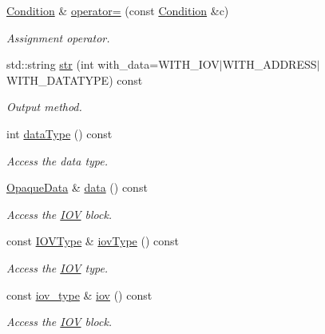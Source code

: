 \begin{DoxyCompactItemize}
\hyperlink{class_d_d4hep_1_1_conditions_1_1_condition}{Condition} \& \hyperlink{class_d_d4hep_1_1_conditions_1_1_condition_a270d3763943c0042ed991a310670ea5c}{operator=} (const \hyperlink{class_d_d4hep_1_1_conditions_1_1_condition}{Condition} \&c)
\begin{DoxyCompactList}\small\item\em Assignment operator. \item\end{DoxyCompactList}\item 
std::string \hyperlink{class_d_d4hep_1_1_conditions_1_1_condition_ac877415327919f75d4d88d3f9c67f2f5}{str} (int with\_\-data=WITH\_\-IOV$|$WITH\_\-ADDRESS$|$WITH\_\-DATATYPE) const 
\begin{DoxyCompactList}\small\item\em Output method. \item\end{DoxyCompactList}\item 
int \hyperlink{class_d_d4hep_1_1_conditions_1_1_condition_a927e07797c9f318c43aa7ed220e3b424}{dataType} () const 
\begin{DoxyCompactList}\small\item\em Access the data type. \item\end{DoxyCompactList}\item 
\hyperlink{class_d_d4hep_1_1_opaque_data}{OpaqueData} \& \hyperlink{class_d_d4hep_1_1_conditions_1_1_condition_a1154252bf161472cd72411149a10702d}{data} () const 
\begin{DoxyCompactList}\small\item\em Access the \hyperlink{class_d_d4hep_1_1_i_o_v}{IOV} block. \item\end{DoxyCompactList}\item 
const \hyperlink{class_d_d4hep_1_1_i_o_v_type}{IOVType} \& \hyperlink{class_d_d4hep_1_1_conditions_1_1_condition_a855588ac1eb5fea843808c0fce5dd3aa}{iovType} () const 
\begin{DoxyCompactList}\small\item\em Access the \hyperlink{class_d_d4hep_1_1_i_o_v}{IOV} type. \item\end{DoxyCompactList}\item 
const \hyperlink{class_d_d4hep_1_1_i_o_v}{iov\_\-type} \& \hyperlink{class_d_d4hep_1_1_conditions_1_1_condition_ab22cbdbeece6355070483572b6a117fb}{iov} () const 
\begin{DoxyCompactList}\small\item\em Access the \hyperlink{class_d_d4hep_1_1_i_o_v}{IOV} block. \item\end{DoxyCompactList}\item 

\end{DoxyCompactItemize}

